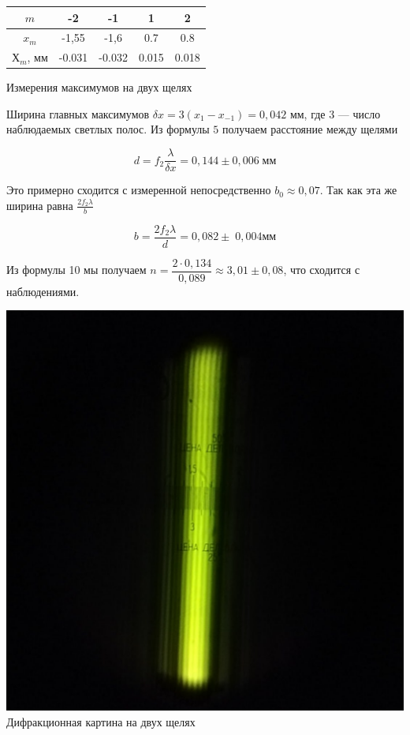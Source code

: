 \documentclass[a4paper, 12pt]{article}%
\begin{document}
\begin{center}
\begin{tabular}{|c|c|c|c|c|}
	\hline
	$m$ & -2 & -1 & 1 & 2 \\
	\hline
	$x_m$ & -1,55 & -1,6 & 0.7 & 0.8 \\
	\hline
	$Х_m$, мм & -0.031 & -0.032 & 0.015 & 0.018 \\
	\hline
\end{tabular}

\begin{center}
Измерения максимумов на двух щелях\
\end{center}

\end{center}


 Ширина главных максимумов $  \delta x  = 3 (x_{1} - x_{-1} )= 0,042 $ мм, где 3 --- число наблюдаемых светлых полос. Из формулы $5$ получаем расстояние между щелями

 \begin{equation}\label{}
 d = f_2 \dfrac{\lambda}{\delta x} = 0,144 \pm 0,006 \; мм
 \end{equation}

Это примерно сходится с измеренной непосредственно $ b_0 \approx 0,07 $. Так как эта же ширина равна $ \frac{2f_2 \lambda}{b}$

 \begin{equation}\label{}
 b = \dfrac{2 f_2 \lambda}{d} = 0,082 \pm \;0,004 мм
 \end{equation}

 Из формулы 10 мы получаем $ n = \dfrac{2\cdot 0,134}{0,089} \approx 3,01 \pm 0,08 $, что сходится с наблюдениями.

  \begin{center}
    \includegraphics[scale=0.25]{pics/8.png}\\

    Дифракционная картина на двух щелях
  \end{center}
\end{document}
